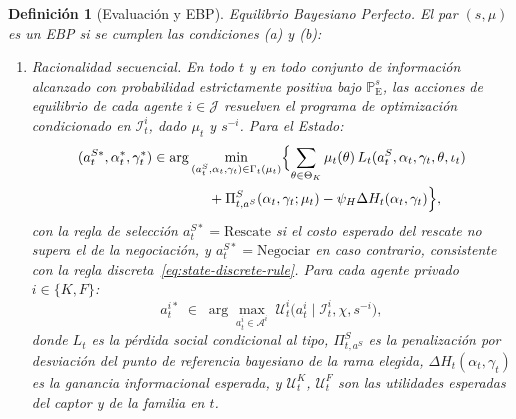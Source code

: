 \documentclass[pdflatex,sn-mathphys-ay]{sn-jnl}
\theoremstyle{thmstyleone}
\theoremstyle{thmstyletwo}
\theoremstyle{thmstylethree}
\newtheorem{definition}{Definición}
\newcommand{\ProbE}{\mathbb{P}_{\mathrm{E}}}
\newcommand{\ThetaK}{\Theta_K}
\newcommand{\1}{\mathbf{1}}
\begin{document}
\begin{definition}[Evaluación y EBP]
\smallskip
\noindent Equilibrio Bayesiano Perfecto. El par $(s,\mu)$ es un EBP si se cumplen las condiciones \textup{(a)} y \textup{(b)}:
\begin{enumerate}
  \item[\textup{(a)}] Racionalidad secuencial. En todo $t$ y en todo conjunto de información alcanzado con probabilidad estrictamente positiva bajo $\ProbE^s$, las acciones de equilibrio de cada agente $i\in\mathcal{J}$ resuelven el programa de optimización condicionado en $\mathcal{I}_t^i$, dado $\mu_t$ y $s^{-i}$. Para el Estado:
  \[
  \begin{aligned}
  (a_t^{S\ast},\alpha_t^\ast,\gamma_t^\ast)
  &\in
  \arg\min_{(a_t^S,\alpha_t,\gamma_t)\in\Gamma_t(\mu_t)}
  \Bigl\{
  \sum_{\theta\in\ThetaK}\mu_t(\theta)\,L_t(a_t^S,\alpha_t,\gamma_t,\theta,\iota_t)\\
  &\qquad\qquad
  +\Pi_{t,a^S}^S(\alpha_t,\gamma_t;\mu_t)-\psi_H\Delta H_t(\alpha_t,\gamma_t)
  \Bigr\},
  \end{aligned}
  \]
  con la regla de selección $a_t^{S\ast}=\text{Rescate}$ si el costo esperado del rescate no supera el de la negociación, y $a_t^{S\ast}=\text{Negociar}$ en caso contrario, consistente con la regla discreta~\eqref{eq:state-discrete-rule}. Para cada agente privado $i\in\{K,F\}$:
  \[
  a_t^{i\ast}\;\in\;
  \arg\max_{a_t^i\in\mathcal{A}^i}
  \;\mathcal{U}^i_t\!\bigl(a_t^i\mid \mathcal{I}_t^i,\chi,s^{-i}\bigr),
  \]
  donde $L_t$ es la pérdida social condicional al tipo, $\Pi_{t,a^S}^S$ es la penalización por desviación del punto de referencia bayesiano de la rama elegida, $\Delta H_t(\alpha_t,\gamma_t)$ es la ganancia informacional esperada, y $\mathcal{U}^K_t$, $\mathcal{U}^F_t$ son las utilidades esperadas del captor y de la familia en $t$.


\end{enumerate}
\end{definition}
\end{document}
